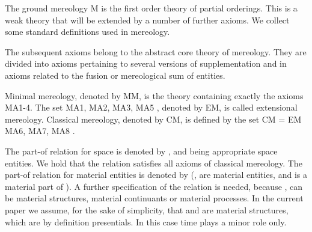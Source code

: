 \documentclass{ao2e}
\begin{document}
{\begin{enumAx}[MA]
   
   
\end{enumAx}  

The ground mereology M is the first order theory of partial orderings. This is a weak theory that will be extended by a number of further axioms. We collect some standard definitions used in mereology. 

\begin{enumAx}[MD]
   
   


   
   


\end{enumAx}  

The subsequent axioms belong to the abstract core theory of mereology. They are divided into axioms
pertaining to several versions of supplementation and in axioms related to the fusion or mereological sum of
entities.
 
 \begin{enumAx}[MA]
 
 
  
  
 \end{enumAx}
 
 Minimal mereology, denoted by MM, is the theory containing exactly the axioms MA1-4.
 The set  MA1, MA2, MA3, MA5 , denoted by EM, is called extensional mereology. Classical mereology, denoted by CM, is defined by the set CM = EM   MA6, MA7, MA8 .

The part-of relation for space is denoted by ,  and  being appropriate space entities. We hold that the relation  satisfies all axioms of classical mereology.
The part-of relation for material entities is denoted by  (,  are material entities, and  is a material part of ). A further specification of the relation   is needed, because ,  can be material structures, material continuants or material processes. In the current paper we assume, for the sake of simplicity, that  and  are material structures, which are by definition presentials. In this case time plays a minor role only.

}
\end{document}
